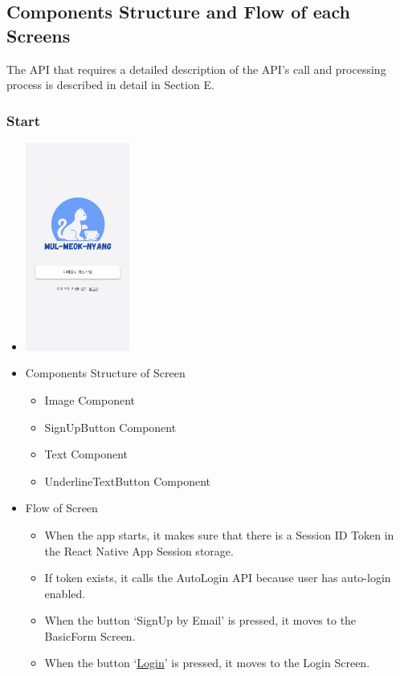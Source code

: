 \documentclass[conference]{IEEEtran}
\begin{document}
\subsection{Components Structure and Flow of each Screens}
The API that requires a detailed description of the API's call and processing process is described in detail in Section E.\\

\subsubsection{Start}
\begin{itemize}
    \item[] \includegraphics[width=0.27\textwidth]{img/Screen/1_Start.png}
    \item Components Structure of Screen
    \begin{itemize}
        \item Image Component
        \item SignUpButton Component
        \item Text Component
        \item UnderlineTextButton Component
    \end{itemize}
    \item Flow of Screen
    \begin{itemize}
        \item When the app starts, it makes sure that there is a Session ID Token in the React Native App Session storage.
        \item If token exists, it calls the AutoLogin API because user has auto-login enabled.
        \item When the button ‘SignUp by Email’ is pressed, it moves to the BasicForm Screen.
        \item When the button ‘\underline{Login}’ is pressed, it moves to the Login Screen. 
        \\
    \end{itemize}
\end{itemize}
\newpage
\end{document}
